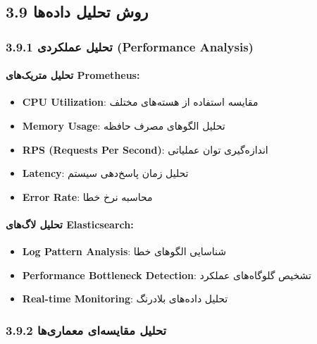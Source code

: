 \documentclass[
]{article}
\providecommand{\tightlist}{%
  \setlength{\itemsep}{0pt}\setlength{\parskip}{0pt}}
\begin{document}
\subsection{3.9 روش تحلیل
داده‌ها}\label{ux631ux648ux634-ux62aux62dux644ux6ccux644-ux62fux627ux62fux647ux647ux627}

\subsubsection{3.9.1 تحلیل عملکردی (Performance
Analysis)}\label{ux62aux62dux644ux6ccux644-ux639ux645ux644ux6a9ux631ux62fux6cc-performance-analysis}

\paragraph{تحلیل متریک‌های
Prometheus:}\label{ux62aux62dux644ux6ccux644-ux645ux62aux631ux6ccux6a9ux647ux627ux6cc-prometheus}

\begin{itemize}
\tightlist
\item
  \textbf{CPU Utilization}: مقایسه استفاده از هسته‌های مختلف
\item
  \textbf{Memory Usage}: تحلیل الگوهای مصرف حافظه
\item
  \textbf{RPS (Requests Per Second)}: اندازه‌گیری توان عملیاتی
\item
  \textbf{Latency}: تحلیل زمان پاسخ‌دهی سیستم
\item
  \textbf{Error Rate}: محاسبه نرخ خطا
\end{itemize}

\paragraph{تحلیل لاگ‌های
Elasticsearch:}\label{ux62aux62dux644ux6ccux644-ux644ux627ux6afux647ux627ux6cc-elasticsearch}

\begin{itemize}
\tightlist
\item
  \textbf{Log Pattern Analysis}: شناسایی الگوهای خطا
\item
  \textbf{Performance Bottleneck Detection}: تشخیص گلوگاه‌های عملکرد
\item
  \textbf{Real-time Monitoring}: تحلیل داده‌های بلادرنگ
\end{itemize}

\subsubsection{3.9.2 تحلیل مقایسه‌ای
معماری‌ها}\label{ux62aux62dux644ux6ccux644-ux645ux642ux627ux6ccux633ux647ux627ux6cc-ux645ux639ux645ux627ux631ux6ccux647ux627}
\end{document}
